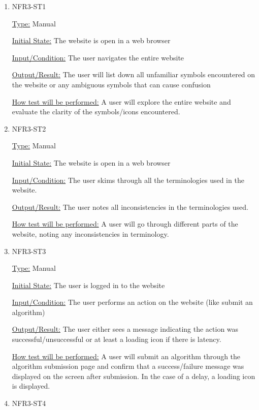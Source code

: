 \documentclass[12pt, titlepage]{article}
\begin{document}
\begin{enumerate}

\item{NFR3-ST1\\}

\underline{Type:} Manual

\underline{Initial State:} The website is open in a web browser

\underline{Input/Condition:} The user navigates the entire website

\underline{Output/Result:} The user will list down all unfamiliar symbols encountered on the website or any ambiguous symbols that can cause confusion

\underline{How test will be performed:} 
A user will explore the entire website and evaluate the clarity of the symbols/icons encountered.

\item{NFR3-ST2\\}

\underline{Type:} Manual

\underline{Initial State:} The website is open in a web browser

\underline{Input/Condition:} The user skims through all the terminologies used in the website.

\underline{Output/Result:} The user notes all inconsistencies in the terminologies used.

\underline{How test will be performed:} 
A user will go through different parts of the website, noting any inconsistencies in terminology.

\item{NFR3-ST3\\}

\underline{Type:} Manual

\underline{Initial State:} The user is logged in to the website

\underline{Input/Condition:} The user performs an action on the website (like submit an algorithm)

\underline{Output/Result:} The user either sees a message indicating the action was successful/unsuccessful or at least a loading icon if there is latency. 

\underline{How test will be performed:} 
A user will submit an algorithm through the algorithm submission page and confirm that a success/failure message was displayed on the screen after submission. In the case of a delay, a loading icon is displayed.

\item{NFR3-ST4\\}


\end{enumerate}
\end{document}
